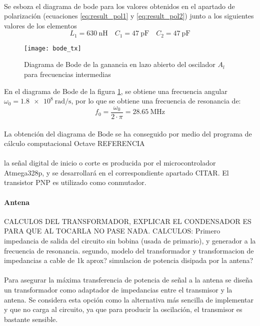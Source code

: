 \paragraph{}
Se esboza el diagrama de bode para los valores obtenidos en el apartado de polarizaci\'on (ecuaciones \ref{eq:result_pol1} y \ref{eq:result_pol2}) junto a los siguientes valores de los elementos 
$$ L_1 = \SI{630}{\nano\henry} \quad C_1=\SI{47}{\pico\farad} \quad C_2=\SI{47}{\pico\farad} $$
\begin{figure}[h]
    \centering
    \texttt{[image: bode\_tx]}
    \caption{Diagrama de Bode de la ganancia en lazo abierto del oscilador $A_l$ para frecuencias intermedias}
    \label{fig:bode_tx}
\end{figure}
En el diagrama de Bode de la figura \ref{fig:bode_tx}, se obtiene una frecuencia angular $\omega_0 = \SI{1.8e8}{\radian\per\second}$, por lo que se obtiene una frecuencia de resonancia de:
\begin{equation}
   f_0 = \frac{\omega_0}{2\cdot\pi} = \SI{28.65}{\mega\hertz}
\end{equation}
\paragraph{}
La obtenci\'on del diagrama de Bode se ha conseguido por medio del programa de c\'alculo computacional Octave REFERENCIA

\paragraph{} la señal digital de inicio o corte es producida por el microcontrolador Atmega328p, y se desarrollará en el correspondiente apartado CITAR. El transistor PNP es utilizado como conmutador.

\paragraph{Antena} CALCULOS DEL TRANSFORMADOR, EXPLICAR EL CONDENSADOR ES PARA QUE AL TOCARLA NO PASE NADA.
CALCULOS: 
Primero impedancia de salida del circuito sin bobina (usada de primario), y generador a la frecuencia de resonancia. 
segundo, modelo del transformador y transformacion de impedancias a cable de 1k aprox?
simulacion de potencia disipada por la antena?
\paragraph{}
Para asegurar la máxima transferencia de potencia de señal a la antena se diseña un transformador como adaptador de impedancias entre el transmisor y la antena. Se considera esta opción como la alternativa más sencilla de implementar y que no carga al circuito, ya que para producir la oscilación, el transmisor es bastante sensible.
